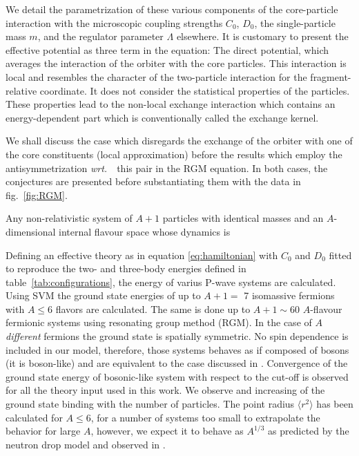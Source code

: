 \documentclass[preprint,12pt]{elsarticle}
\newcommand{\wrt}{\textit{wrt.}~}
\newcommand{\figref}[1]{fig.~\ref{#1}}
\newcommand{\tabref}[1]{table~\ref{#1}}
\begin{document}
We detail the parametrization of these various components of the core-particle interaction with the
microscopic coupling strengths $C_0$, $D_0$, the single-particle mass $m$, and the regulator parameter $\Lambda$
elsewhere. It is customary to present the effective potential as three term in the equation:
The direct potential, which averages the interaction of the orbiter with the core particles. This interaction is
local and resembles the character of the two-particle interaction for the fragment-relative coordinate. It does not
consider the statistical properties of the particles.
These properties lead to the non-local exchange interaction which contains an energy-dependent part which
is conventionally called the exchange kernel.

We shall discuss the case which disregards the exchange of the orbiter with one of the core constituents (local
approximation) before the results which employ the antisymmetrization \wrt~this pair in the RGM equation.
In both cases, the conjectures are presented before substantiating them with the data in \figref{fig:RGM}.

Any non-relativistic system of $A+1$ particles with identical masses and an $A$-dimensional internal flavour space
whose dynamics is 



Defining an effective theory as in equation \ref{eq:hamiltonian} with $C_0$ and $D_0$ fitted to reproduce the two- and 
three-body energies defined in \tabref{tab:configurations}, the energy of varius P-wave systems are calculated.
Using SVM the ground state energies of up to $A+1=$ 7 isomassive fermions with $A \le $6 flavors are calculated.
The same is done up to $A+1\sim$60 $A$-flavour fermionic systems using resonating group method (RGM).
In the case of $A$ \textit{different} fermions the ground state is spatially symmetric.
No spin dependence is included in our model, therefore, those systems behaves as if composed of bosons (it is boson-like) 
and are equivalent to the case discussed in \cite{manybosons}.
Convergence of the ground state energy of bosonic-like system with respect to the cut-off is observed for all the theory 
input used in this work.
We observe and increasing of the ground state binding with the number of particles. 
The point radius $\langle r^2 \rangle$ has been calculated for $A\le6$, for a number of systems too small to extrapolate the 
behavior for large $A$, however, we expect it to behave as $A^{1/3}$ as predicted by the neutron drop model and observed in  
\cite{manybosons}.
\end{document}
